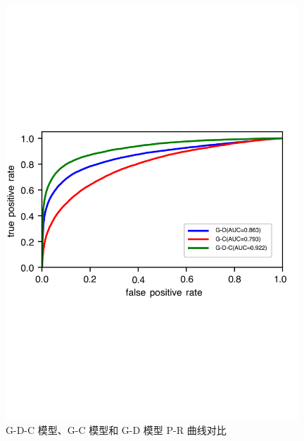 \begin{figure}[H]
	\centering
	\includegraphics[width=0.98\textwidth]{figure/ROC_u_d_u_c_u_d_c_components}
	\caption{G-D-C 模型、G-C 模型和 G-D 模型 P-R 曲线对比}
	\label{fig:roc_u_d_u_c_u_d_c_components}
\end{figure}
\endinput
